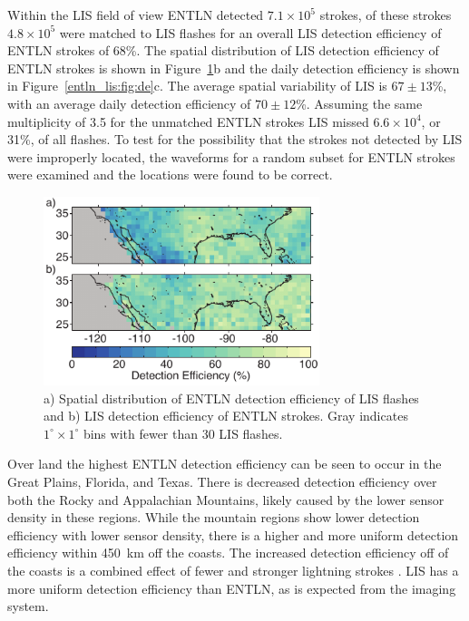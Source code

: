 Within the LIS field of view ENTLN detected $7.1\times10^5$ strokes, of these strokes $4.8\times10^5$ were matched to LIS flashes for an overall LIS detection efficiency of ENTLN strokes of 68\%.
The spatial distribution of LIS detection efficiency of ENTLN strokes is shown in Figure~\ref{entln_lis:fig:map}b and the daily detection efficiency is shown in Figure~\ref{entln_lis:fig:de}c.
The average spatial variability of LIS is $67 \pm 13$\%, with an average daily detection efficiency of $70 \pm 12$\%.
Assuming the same multiplicity of 3.5 for the unmatched ENTLN strokes LIS missed $6.6\times10^4$, or 31\%, of all flashes.
To test for the possibility that the strokes not detected by LIS were improperly located, the waveforms for a random subset for ENTLN strokes were examined and the locations were found to be correct.

\begin{figure}[t]
   \centering
   \noindent\includegraphics[width=19pc,angle=0]{entln_lis/Figures/map.pdf}
   \caption{a) Spatial distribution of ENTLN detection efficiency of LIS flashes and
   		b) LIS detection efficiency of ENTLN strokes.
   		Gray indicates $1^\circ \times 1^\circ$ bins with fewer than 30 LIS flashes.
		}
   \label{entln_lis:fig:map}
\end{figure}

Over land the highest ENTLN detection efficiency can be seen to occur in the Great Plains, Florida, and Texas.
There is decreased detection efficiency over both the Rocky and Appalachian Mountains, likely caused by the lower sensor density in these regions.
While the mountain regions show lower detection efficiency with lower sensor density, there is a higher and more uniform detection efficiency within 450~km off the coasts.
The increased detection efficiency off of the coasts is a combined effect of fewer and stronger lightning strokes \citep{Hutchins2013, Rudlosky2010}.
LIS has a more uniform detection efficiency than ENTLN, as is expected from the imaging system.

